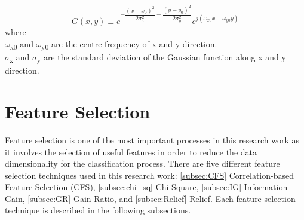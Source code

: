 \documentclass[review]{elsarticle}
\begin{document}
\begin{equation}
G(x,y)\equiv e^{-{\dfrac{(x-x_0)^2}{2\sigma^2_x}-\dfrac{(y-y_0)^2}{2\sigma^2_y}}} e^{j(\omega_{x0}x+\omega_{y0}y)}
\label{eq:Gabor}
\end{equation}
where \\
$\omega$\textsubscript{x0}   and   $\omega$\textsubscript{y0} \hspace{0.2cm}   are the centre frequency of x and y direction.\\
$\sigma$\textsubscript{x}    and   $\sigma$\textsubscript{y}   \hspace{0.5cm}  are the standard deviation of the Gaussian function along x and y direction. 


\section{Feature Selection}

Feature selection is one of the most important processes in this research work as it involves the selection of useful features in order to reduce the data dimensionality for the classification process. There are five different feature selection techniques used in this research work: \ref{subsec:CFS} Correlation-based Feature Selection (CFS), \ref{subsec:chi_sq} Chi-Square, \ref{subsec:IG} Information Gain, \ref{subsec:GR} Gain Ratio,  and \ref{subsec:Relief} Relief. Each feature selection technique is described in the following subsections.
\end{document}
